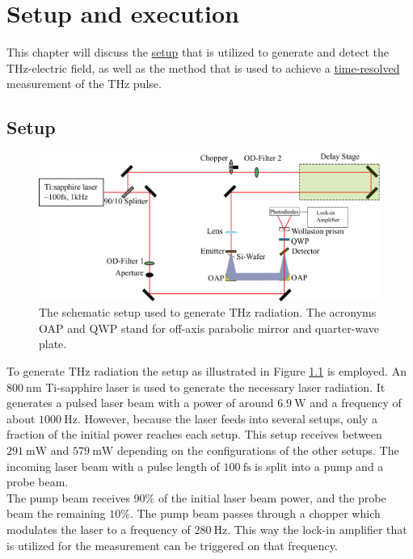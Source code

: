 \chapter{Setup and execution}
This chapter will discuss the \hyperref[sec:setup]{setup} that is utilized to generate and detect the $\si{\tera\hertz}$-electric field, as well as the method that is used to achieve a \hyperref[sec:time_domain]{time-resolved} measurement of the $\si{\tera\hertz}$ pulse.
\section{Setup}
\label{sec:setup}
\begin{figure}
    \centering
    \includegraphics[width=\textwidth]{Plots/Aufbau.pdf}
    \caption{The schematic setup used to generate $\si{\tera\hertz}$ radiation.
    The acronyms OAP and QWP stand for off-axis parabolic mirror and quarter-wave plate. }
    \label{fig:setup}
\end{figure}
To generate $\si{\tera\hertz}$ radiation the setup as illustrated in Figure \ref{fig:setup} is employed.
An $\SI{800}{\nano\meter}$ Ti-sapphire laser is used to generate the necessary laser radiation.
It generates a pulsed laser beam with a power of around $\SI{6.9}{\W}$ and a frequency of about $\SI{1000}{\Hz}$.
However, because the laser feeds into several setups, only a fraction of the initial power reaches each setup.
This setup receives between $\SI{291}{\milli\W}$ and $\SI{579}{\milli\W}$ depending on the configurations of the other setups. 
The incoming laser beam with a pulse length of $\SI{100}{\femto\second}$ is split into a pump and a probe beam.
\\
The pump beam receives $90\%$ of the initial laser beam power, and the probe beam the remaining $10\%$.
The pump beam passes through a chopper which modulates the laser to a frequency of $\SI{280}{\hertz}$.
This way the lock-in amplifier that is utilized for the measurement can be triggered on that frequency.
